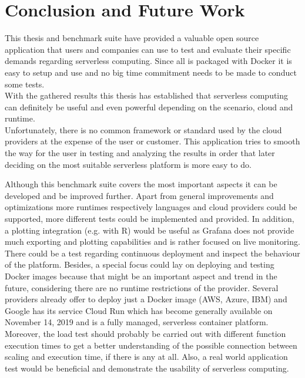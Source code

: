 
\section{Conclusion and Future Work}
This thesis and benchmark suite have provided a valuable open source application that users and companies can use to test and evaluate their specific demands regarding serverless computing. Since all is packaged with Docker it is easy to setup and use and no big time commitment needs to be made to conduct some tests.\\
With the gathered results this thesis has established that serverless computing can definitely be useful and even powerful depending on the scenario, cloud and runtime.\\
Unfortunately, there is no common framework or standard used by the cloud providers at the expense of the user or customer. This application tries to smooth the way for the user in testing and analyzing the results in order that later deciding on the most suitable serverless platform is more easy to do.

Although this benchmark suite covers the most important aspects it can be developed and be improved further. Apart from general improvements and optimizations more runtimes respectively languages and cloud providers could be supported, more different tests could be implemented and provided. In addition, a plotting integration (e.g. with R) would be useful as Grafana does not provide much exporting and plotting capabilities and is rather focused on live monitoring.\\
There could be a test regarding continuous deployment and inspect the behaviour of the platform. Besides, a special focus could lay on deploying and testing Docker images because that might be an important aspect and trend in the future, considering there are no runtime restrictions of the provider. Several providers already offer to deploy just a Docker image (AWS, Azure, IBM) and Google has its service Cloud Run which has become generally available on November 14, 2019 \cite{cloudrun} and is a fully managed, serverless container platform.\\ Moreover, the load test should probably be carried out with different function execution times to get a better understanding of the possible connection between scaling and execution time, if there is any at all. Also, a real world application test would be beneficial and demonstrate the usability of serverless computing.